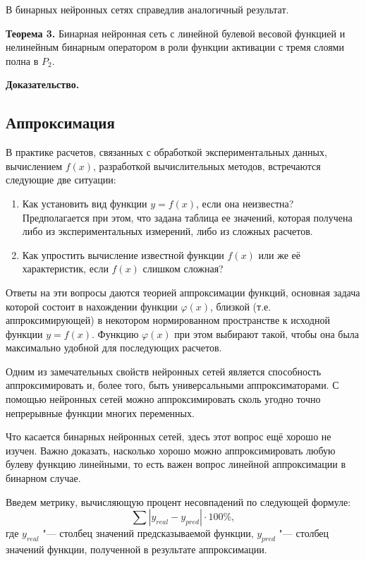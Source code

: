\documentclass[a4paper, 14pt]{extarticle}
\begin{document}
    В бинарных нейронных сетях справедлив аналогичный результат.
    
    \textbf{Теорема 3.}
    Бинарная нейронная сеть с линейной булевой весовой функцией и нелинейным бинарным оператором в роли функции активации с тремя слоями полна в $P_2$.
    
    \textbf{Доказательство.}
    
    
\subsection{Аппроксимация}   
    В практике расчетов, связанных с обработкой экспериментальных данных, вычислением $f(x)$, разработкой вычислительных методов, встречаются следующие две ситуации:
    
    \begin{enumerate}
    \item Как установить вид функции $y = f(x)$, если она неизвестна? Предполагается при этом, что задана таблица ее значений, которая получена либо из экспериментальных измерений, либо из сложных расчетов.
    \item Как упростить вычисление известной функции $f(x)$ или же её характеристик, если $f(x)$ слишком сложная?
    \end{enumerate}
    
    Ответы на эти вопросы даются теорией аппроксимации функций, основная задача которой состоит в нахождении функции $\varphi(x)$, близкой (т.е. аппроксимирующей) в некотором нормированном пространстве к исходной функции $y = f(x)$. Функцию $\varphi(x)$ при этом выбирают такой, чтобы она была максимально удобной для последующих расчетов.
    
    Одним из замечательных свойств нейронных сетей является способность аппроксимировать и, более того, быть универсальными аппроксиматорами. С помощью нейронных сетей можно аппроксимировать сколь угодно точно непрерывные функции многих переменных.
    
    Что касается бинарных нейронных сетей, здесь этот вопрос ещё хорошо не изучен. Важно доказать, насколько хорошо можно аппроксимировать любую булеву функцию линейными, то есть важен вопрос линейной аппроксимации в бинарном случае.
    
    Введем метрику, вычисляющую процент несовпадений по следующей формуле:
    $$\sum |y_{real} - y_{pred}| \cdot 100\%,$$ где $y_{real}$ "--- столбец значений предсказываемой функции, $y_{pred}$ "--- столбец значений функции, полученной в результате аппроксимации.
    
\end{document}
